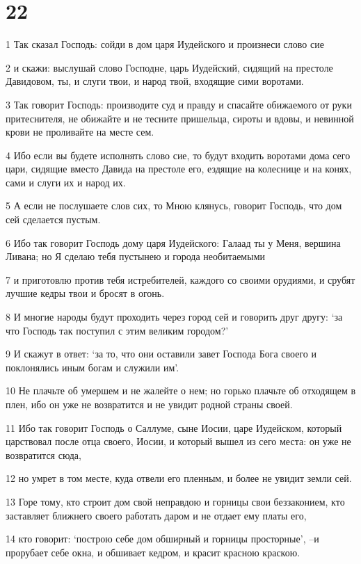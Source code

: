 \chapter{22}

\par 1 Так сказал Господь: сойди в дом царя Иудейского и произнеси слово сие
\par 2 и скажи: выслушай слово Господне, царь Иудейский, сидящий на престоле Давидовом, ты, и слуги твои, и народ твой, входящие сими воротами.
\par 3 Так говорит Господь: производите суд и правду и спасайте обижаемого от руки притеснителя, не обижайте и не тесните пришельца, сироты и вдовы, и невинной крови не проливайте на месте сем.
\par 4 Ибо если вы будете исполнять слово сие, то будут входить воротами дома сего цари, сидящие вместо Давида на престоле его, ездящие на колеснице и на конях, сами и слуги их и народ их.
\par 5 А если не послушаете слов сих, то Мною клянусь, говорит Господь, что дом сей сделается пустым.
\par 6 Ибо так говорит Господь дому царя Иудейского: Галаад ты у Меня, вершина Ливана; но Я сделаю тебя пустынею и города необитаемыми
\par 7 и приготовлю против тебя истребителей, каждого со своими орудиями, и срубят лучшие кедры твои и бросят в огонь.
\par 8 И многие народы будут проходить через город сей и говорить друг другу: `за что Господь так поступил с этим великим городом?'
\par 9 И скажут в ответ: `за то, что они оставили завет Господа Бога своего и поклонялись иным богам и служили им'.
\par 10 Не плачьте об умершем и не жалейте о нем; но горько плачьте об отходящем в плен, ибо он уже не возвратится и не увидит родной страны своей.
\par 11 Ибо так говорит Господь о Саллуме, сыне Иосии, царе Иудейском, который царствовал после отца своего, Иосии, и который вышел из сего места: он уже не возвратится сюда,
\par 12 но умрет в том месте, куда отвели его пленным, и более не увидит земли сей.
\par 13 Горе тому, кто строит дом свой неправдою и горницы свои беззаконием, кто заставляет ближнего своего работать даром и не отдает ему платы его,
\par 14 кто говорит: `построю себе дом обширный и горницы просторные', --и прорубает себе окна, и обшивает кедром, и красит красною краскою.
